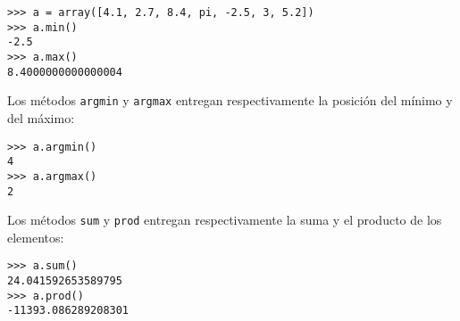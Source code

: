 \begin{lstlisting}
>>> a = array([4.1, 2.7, 8.4, pi, -2.5, 3, 5.2])
>>> a.min()
-2.5
>>> a.max()
8.4000000000000004
\end{lstlisting}

Los métodos \lstinline!argmin! y \lstinline!argmax! entregan
respectivamente la posición del mínimo y del máximo:

\begin{lstlisting}
>>> a.argmin()
4
>>> a.argmax()
2
\end{lstlisting}

Los métodos \lstinline!sum! y \lstinline!prod! entregan respectivamente
la suma y el producto de los elementos:

\begin{lstlisting}
>>> a.sum()
24.041592653589795
>>> a.prod()
-11393.086289208301
\end{lstlisting}

